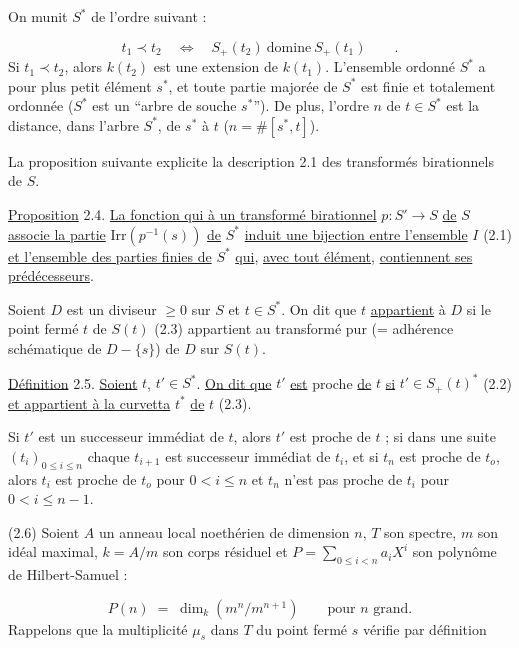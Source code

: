 On munit $S^*$ de l'ordre suivant :

\begin{equation*}
t_1 \prec t_2 \quad \Longleftrightarrow \quad S_+(t_2) \ \mbox{domine} \ S_+(t_1) \qquad .
\end{equation*}
Si $t_1 \prec t_2$, alors $k(t_2)$ est une extension de $k(t_1)$. L'ensemble ordonné $S^*$ a pour plus petit élément $s^*$, et toute partie majorée de $S^*$ est finie et totalement ordonnée ($S^*$ est un ``arbre de souche $s^*$''). De plus, l'ordre $n$ de $t \in S^*$ est la distance, dans l'arbre $S^*$, de $s^*$ à $t$ ($n = \#[s^*,t]$).

La proposition suivante explicite la description 2.1 des transformés birationnels de $S$.

\underline{Proposition} 2.4. \underline{La fonction qui à un transformé birationnel} $p : S' \to S$ \underline{de} $S$ \underline{associe la partie} $\mathrm{Irr}(p^{-1}(s))$ \underline{de} $S^*$ \underline{induit une bijection entre l'ensemble} $I$ (2.1) \underline{et l'ensemble des parties finies de} $S^*$ \underline{qui}, \underline{avec tout élément},
\underline{contiennent ses prédécesseurs}.

Soient $D$ est un diviseur $\geq 0$ sur $S$ et $t \in S^*$. On dit que $t$ \underline{appartient} à $D$ si le point fermé $t$ de $S(t)$ (2.3) appartient au transformé pur (= adhérence schématique de $D - \{s\}$) de $D$ sur $S(t)$.

\underline{Définition} 2.5. \underline{Soient} $t$, $t' \in S^*$. \underline{On dit que} $t'$ \underline{est} proche \underline{de} $t$ \underline{si} $t' \in S_+(t)^*$ (2.2) \underline{et appartient à la curvetta} $t^*$ \underline{de} $t$ (2.3).

Si $t'$ est un successeur immédiat de $t$, alors $t'$ est proche de $t$ ; si dans une suite $(t_i)_{0 \leq i \leq n}$ chaque $t_{i+1}$ est successeur immédiat de $t_i$, et si $t_n$ est proche de $t_o$, alors $t_i$ est proche de $t_o$ pour $0 < i \leq n$ et $t_n$ n'est pas proche de $t_i$ pour $0 < i \leq n-1$.

(2.6)  Soient $A$ un anneau local noethérien de dimension $n$, $T$ son spectre, $m$ son idéal maximal, $k = A/m$ son corps résiduel et $P = \sum_{0 \leq i < n} a_i X^i$ son polynôme de Hilbert-Samuel :

\begin{equation*}
P(n) \;=\; \dim_k(m^n/m^{n+1}) \qquad \text{pour } n \text{ grand.}
\end{equation*}
Rappelons que la multiplicité $\mu_s$ dans $T$ du point fermé $s$ vérifie par définition


